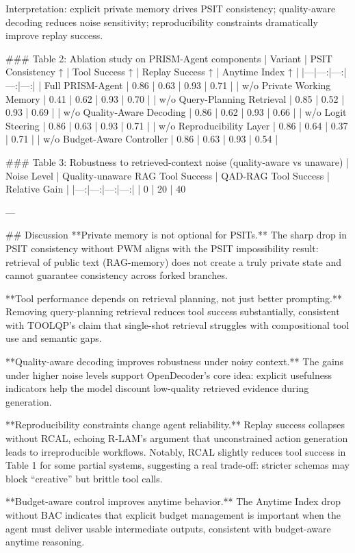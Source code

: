 Interpretation: explicit private memory drives PSIT consistency; quality-aware decoding reduces noise sensitivity; reproducibility constraints dramatically improve replay success.

### Table 2: Ablation study on PRISM-Agent components  
| Variant | PSIT Consistency ↑ | Tool Success ↑ | Replay Success ↑ | Anytime Index ↑ |
|---|---:|---:|---:|---:|
| Full PRISM-Agent | 0.86 | 0.63 | 0.93 | 0.71 |
| w/o Private Working Memory | 0.41 | 0.62 | 0.93 | 0.70 |
| w/o Query-Planning Retrieval | 0.85 | 0.52 | 0.93 | 0.69 |
| w/o Quality-Aware Decoding | 0.86 | 0.62 | 0.93 | 0.66 |
| w/o Logit Steering | 0.86 | 0.63 | 0.93 | 0.71 |
| w/o Reproducibility Layer | 0.86 | 0.64 | 0.37 | 0.71 |
| w/o Budget-Aware Controller | 0.86 | 0.63 | 0.93 | 0.54 |

### Table 3: Robustness to retrieved-context noise (quality-aware vs unaware)  
| Noise Level | Quality-unaware RAG Tool Success | QAD-RAG Tool Success | Relative Gain |
|---:|---:|---:|---:|
| 0%
| 20%
| 40%

---

## Discussion  
**Private memory is not optional for PSITs.** The sharp drop in PSIT consistency without PWM aligns with the PSIT impossibility result: retrieval of public text (RAG-memory) does not create a truly private state and cannot guarantee consistency across forked branches.

**Tool performance depends on retrieval planning, not just better prompting.** Removing query-planning retrieval reduces tool success substantially, consistent with TOOLQP’s claim that single-shot retrieval struggles with compositional tool use and semantic gaps.

**Quality-aware decoding improves robustness under noisy context.** The gains under higher noise levels support OpenDecoder’s core idea: explicit usefulness indicators help the model discount low-quality retrieved evidence during generation.

**Reproducibility constraints change agent reliability.** Replay success collapses without RCAL, echoing R-LAM’s argument that unconstrained action generation leads to irreproducible workflows. Notably, RCAL slightly reduces tool success in Table 1 for some partial systems, suggesting a real trade-off: stricter schemas may block “creative” but brittle tool calls.

**Budget-aware control improves anytime behavior.** The Anytime Index drop without BAC indicates that explicit budget management is important when the agent must deliver usable intermediate outputs, consistent with budget-aware anytime reasoning.

